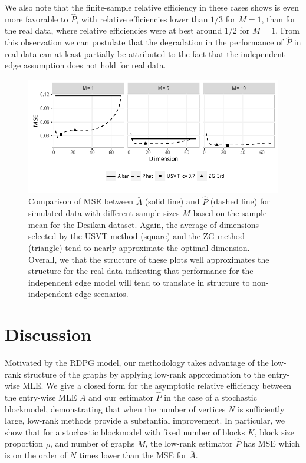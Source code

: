 \documentclass[10pt,letterpaper]{article}
\begin{document}
We also note that the finite-sample relative efficiency in these cases shows is even more favorable to $\hat{P}$, with relative efficiencies lower than $1/3$ for $M=1$, than for the real data, where relative efficiencies were at best around $1/2$ for $M=1$.
From this observation we can postulate that the degradation in the performance of $\hat{P}$ in real data can at least partially be attributed to the fact that the independent edge assumption does not hold for real data.


\begin{figure}[!htb]
\centering
\includegraphics[width=1\textwidth]{sim_desikan.pdf}
\caption{Comparison of MSE between $\bar{A}$ (solid line) and $\hat{P}$ (dashed line) for simulated data with different sample sizes $M$ based on the sample mean for the Desikan dataset. Again, the average of dimensions selected by the USVT method (square) and the ZG method (triangle) tend to nearly approximate the optimal dimension. 
Overall, we that the structure of these plots well approximates the structure for the real data indicating that performance for the independent edge model will tend to translate in structure to non-independent edge scenarios.}
\label{fig:sim_desikan}
\end{figure}



\section{Discussion}

Motivated by the RDPG model, our methodology takes advantage of the low-rank structure of the graphs by applying low-rank approximation to the entry-wise MLE. 
We give a closed form for the asymptotic relative efficiency between the entry-wise MLE $\bar{A}$ and our estimator $\hat{P}$ in the case of a stochastic blockmodel, demonstrating that when the number of vertices $N$ is sufficiently large, low-rank methods provide a substantial improvement.
In particular, we show that for a stochastic blockmodel with fixed number of blocks $K$, block size proportion $\rho$, and number of graphs $M$, the low-rank estimator $\hat{P}$ has MSE which is on the order of $N$ times lower than the MSE for $\bar{A}$.
\end{document}
